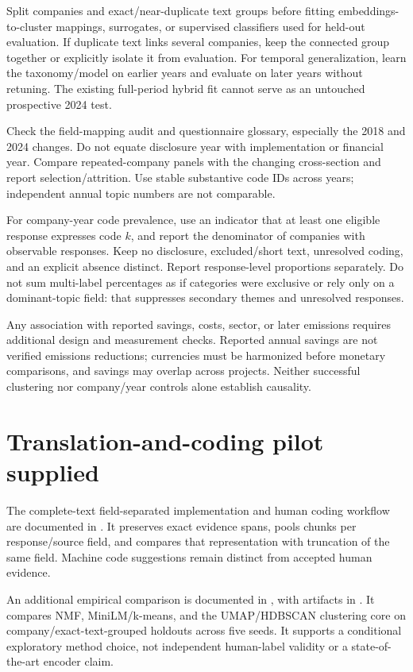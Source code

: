 \documentclass[11pt,a4paper]{article}
\begin{document}
Split companies and exact/near-duplicate text groups before fitting
embeddings-to-cluster mappings, surrogates, or supervised classifiers used
for held-out evaluation. If duplicate text links several companies, keep
the connected group together or explicitly isolate it from evaluation.
For temporal generalization, learn the taxonomy/model on earlier years and
evaluate on later years without retuning. The existing full-period hybrid
fit cannot serve as an untouched prospective 2024 test.

Check the field-mapping audit and questionnaire glossary, especially the
2018 and 2024 changes. Do not equate disclosure year with implementation or
financial year. Compare repeated-company panels with the changing
cross-section and report selection/attrition. Use stable substantive code
IDs across years; independent annual topic numbers are not comparable.

For company-year code prevalence, use an indicator that at least one
eligible response expresses code $k$, and report the denominator of
companies with observable responses. Keep no disclosure, excluded/short
text, unresolved coding, and an explicit absence distinct. Report
response-level proportions separately. Do not sum multi-label percentages
as if categories were exclusive or rely only on a dominant-topic field:
that suppresses secondary themes and unresolved responses.

Any association with reported savings, costs, sector, or later emissions
requires additional design and measurement checks. Reported annual savings
are not verified emissions reductions; currencies must be harmonized
before monetary comparisons, and savings may overlap across projects.
Neither successful clustering nor company/year controls alone establish
causality.

\section{Translation-and-coding pilot supplied}
The complete-text field-separated implementation and human coding workflow
are documented in .
It preserves exact evidence spans, pools chunks per response/source field,
and compares that representation with truncation of the same field.
Machine code suggestions remain distinct from accepted human evidence.

An additional empirical comparison is documented in
, with artifacts in
.
It compares NMF, MiniLM/k-means, and the UMAP/HDBSCAN clustering core on
company/exact-text-grouped holdouts across five seeds. It supports a
conditional exploratory method choice, not independent human-label
validity or a state-of-the-art encoder claim.
\end{document}
